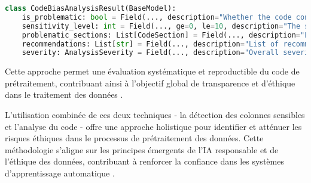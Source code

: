\begin{lstlisting}[language=Python,caption=Modèle pour les résultats de l'analyse de biais]
class CodeBiasAnalysisResult(BaseModel):
    is_problematic: bool = Field(..., description="Whether the code contains potential ethical issues")
    sensitivity_level: int = Field(..., ge=0, le=10, description="The sensitivity level of the potential biases (0-10)")
    problematic_sections: List[CodeSection] = Field(..., description="List of problematic code sections with metadata")
    recommendations: List[str] = Field(..., description="List of recommendations for addressing the potential biases")
    severity: AnalysisSeverity = Field(..., description="Overall severity of the identified issues")
\end{lstlisting}

Cette approche permet une évaluation systématique et reproductible du code de prétraitement, contribuant ainsi à l'objectif global de transparence et d'éthique dans le traitement des données \cite{ref6}.

L'utilisation combinée de ces deux techniques - la détection des colonnes sensibles et l'analyse du code - offre une approche holistique pour identifier et atténuer les risques éthiques dans le processus de prétraitement des données. Cette méthodologie s'aligne sur les principes émergents de l'IA responsable et de l'éthique des données, contribuant à renforcer la confiance dans les systèmes d'apprentissage automatique \cite{ref5}.
